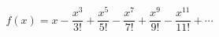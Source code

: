 \documentclass[preview]{standalone}
\begin{document}
\begin{align*}
f(x)=x-\dfrac{x^3}{3!}+\dfrac{x^5}{5!}-\dfrac{x^7}{7!}+\dfrac{x^9}{9!}-\dfrac{x^{11}}{11!}+\cdots
\end{align*}
\end{document}
